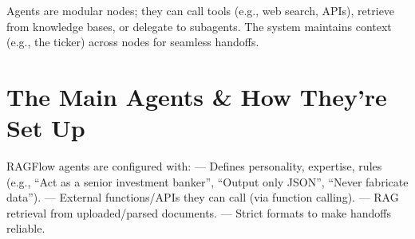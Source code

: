 \documentclass[letterpaper,10pt,english]{sphinxmanual}
\begin{document}
\sphinxAtStartPar
Agents are modular nodes; they can call tools (e.g., web search, APIs),
retrieve from knowledge bases, or delegate to sub\sphinxhyphen{}agents. The system
maintains context (e.g., the ticker) across nodes for seamless handoffs.


\section{The Main Agents \& How They’re Set Up}
\label{\detokenize{agentic-example:the-main-agents-how-theyre-set-up}}
\sphinxAtStartPar
RAGFlow agents are configured with: \sphinxhyphen{}  — Defines
personality, expertise, rules (e.g., “Act as a senior investment
banker”, “Output only JSON”, “Never fabricate data”). \sphinxhyphen{}  —
External functions/APIs they can call (via function calling). \sphinxhyphen{}
 — RAG retrieval from uploaded/parsed documents. \sphinxhyphen{}
 — Strict formats to make handoffs reliable.
\end{document}
